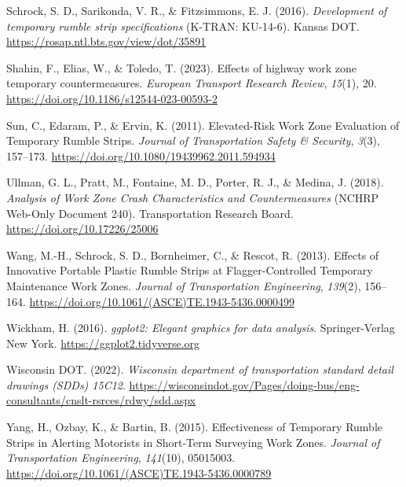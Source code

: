 \documentclass[
  letterpaper,
]{trb}
\newlength{\cslhangindent}
\newenvironment{CSLReferences}[2] %
 {\begin{list}{}{%
  \setlength{\itemindent}{0pt}
  \setlength{\leftmargin}{0pt}
  \setlength{\parsep}{0pt}
  \ifodd #1
   \setlength{\leftmargin}{\cslhangindent}
   \setlength{\itemindent}{-1\cslhangindent}
  \fi
  \setlength{\itemsep}{#2\baselineskip}}}
 {\end{list}}
\begin{document}
\begin{CSLReferences}{1}{0}
Schrock, S. D., Sarikonda, V. R., \& Fitzsimmons, E. J. (2016).
\emph{Development of temporary rumble strip specifications} (K-TRAN:
KU-14-6). Kansas DOT. \url{https://rosap.ntl.bts.gov/view/dot/35891}

Shahin, F., Elias, W., \& Toledo, T. (2023). Effects of highway work
zone temporary countermeasures. \emph{European Transport Research
Review}, \emph{15}(1), 20.
\url{https://doi.org/10.1186/s12544-023-00593-2}

Sun, C., Edaram, P., \& Ervin, K. (2011). Elevated-{Risk Work Zone
Evaluation} of {Temporary Rumble Strips}. \emph{Journal of
Transportation Safety \& Security}, \emph{3}(3), 157--173.
\url{https://doi.org/10.1080/19439962.2011.594934}

Ullman, G. L., Pratt, M., Fontaine, M. D., Porter, R. J., \& Medina, J.
(2018). \emph{Analysis of {Work Zone Crash Characteristics} and
{Countermeasures}} (NCHRP Web-Only Document 240). Transportation
Research Board. \url{https://doi.org/10.17226/25006}

Wang, M.-H., Schrock, S. D., Bornheimer, C., \& Rescot, R. (2013).
Effects of {Innovative Portable Plastic Rumble Strips} at
{Flagger-Controlled Temporary Maintenance Work Zones}. \emph{Journal of
Transportation Engineering}, \emph{139}(2), 156--164.
\url{https://doi.org/10.1061/(ASCE)TE.1943-5436.0000499}

Wickham, H. (2016). \emph{ggplot2: Elegant graphics for data analysis}.
Springer-Verlag New York. \url{https://ggplot2.tidyverse.org}

Wisconsin DOT. (2022). \emph{Wisconsin department of transportation
standard detail drawings (SDDs) 15C12}.
\url{https://wisconsindot.gov/Pages/doing-bus/eng-consultants/cnslt-rsrces/rdwy/sdd.aspx}

Yang, H., Ozbay, K., \& Bartin, B. (2015). Effectiveness of {Temporary
Rumble Strips} in {Alerting Motorists} in {Short-Term Surveying Work
Zones}. \emph{Journal of Transportation Engineering}, \emph{141}(10),
05015003. \url{https://doi.org/10.1061/(ASCE)TE.1943-5436.0000789}

\end{CSLReferences}
\end{document}
